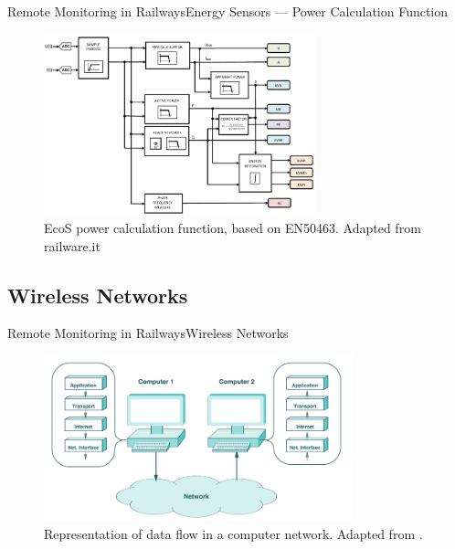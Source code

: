 
\begin{frame}{Remote Monitoring in Railways}{Energy Sensors --- Power Calculation Function}


\begin{figure}[h!]
	\centering
	\includegraphics[width=0.7\textwidth,keepaspectratio]{figures/32.EnergyS/energy_calculation}
	\caption{EcoS power calculation function, based on EN50463. Adapted from railware.it}
\end{figure}
	
	
\end{frame}

\subsection{Wireless Networks}

\begin{frame}{Remote Monitoring in Railways}{Wireless Networks}

\begin{figure}[h!]
	\centering
	\includegraphics[width=0.8\textwidth,keepaspectratio]{figures/33.WirelessN/comer2008}
	\caption{Representation of data flow in a computer network. Adapted from \cite{comer2008}.}
\end{figure}

\end{frame}


